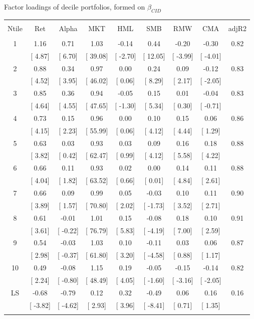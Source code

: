 \documentclass{beamer}
\begin{document}
\begin{frame}{Factor loadings of decile portfolios, formed on $\beta_{CID}$}
\vspace{-0.25cm}
\begin{table}[!htbp] \centering 
  \label{} 
\begin{tabular}{@{\extracolsep{0pt}} ccccccccc} 
\\[-1.8ex]\hline 
\hline \\[-1.8ex] 
Ntile & Ret & Alpha & MKT & HML & SMB & RMW & CMA & adjR2 \\ 
\hline \\[-1.8ex] 
1 & 1.16 & 0.71 & 1.03 & -0.14 & 0.44 & -0.20 & -0.30 & 0.82 \\ 
 & [ 4.87] & [ 6.70] & [ 39.08] & [ -2.70] & [ 12.05] & [ -3.99] & [ -4.01] &  \\ 
2 & 0.88 & 0.34 & 0.97 & 0.00 & 0.24 & 0.09 & -0.12 & 0.83 \\ 
 & [ 4.52] & [ 3.95] & [ 46.02] & [ 0.06] & [ 8.29] & [ 2.17] & [ -2.05] &  \\ 
3 & 0.85 & 0.36 & 0.94 & -0.05 & 0.15 & 0.01 & -0.04 & 0.83 \\ 
 & [ 4.64] & [ 4.55] & [ 47.65] & [ -1.30] & [ 5.34] & [ 0.30] & [ -0.71] &  \\ 
4 & 0.73 & 0.15 & 0.96 & 0.00 & 0.10 & 0.15 & 0.06 & 0.86 \\ 
 & [ 4.15] & [ 2.23] & [ 55.99] & [ 0.06] & [ 4.12] & [ 4.44] & [ 1.29] &  \\ 
5 & 0.63 & 0.03 & 0.93 & 0.03 & 0.09 & 0.16 & 0.18 & 0.88 \\ 
 & [ 3.82] & [ 0.42] & [ 62.47] & [ 0.99] & [ 4.12] & [ 5.58] & [ 4.22] &  \\ 
6 & 0.66 & 0.11 & 0.93 & 0.02 & 0.00 & 0.14 & 0.11 & 0.88 \\ 
 & [ 4.04] & [ 1.82] & [ 63.52] & [ 0.66] & [ 0.01] & [ 4.84] & [ 2.61] &  \\ 
7 & 0.66 & 0.09 & 0.99 & 0.05 & -0.03 & 0.10 & 0.11 & 0.90 \\ 
 & [ 3.89] & [ 1.57] & [ 70.80] & [ 2.02] & [ -1.73] & [ 3.52] & [ 2.71] &  \\ 
8 & 0.61 & -0.01 & 1.01 & 0.15 & -0.08 & 0.18 & 0.10 & 0.91 \\ 
 & [ 3.61] & [ -0.22] & [ 76.79] & [ 5.83] & [ -4.19] & [ 7.00] & [ 2.59] &  \\ 
9 & 0.54 & -0.03 & 1.03 & 0.10 & -0.11 & 0.03 & 0.06 & 0.87 \\ 
 & [ 2.98] & [ -0.37] & [ 61.80] & [ 3.20] & [ -4.58] & [ 0.88] & [ 1.17] &  \\ 
10 & 0.49 & -0.08 & 1.15 & 0.19 & -0.05 & -0.15 & -0.14 & 0.82 \\ 
 & [ 2.24] & [ -0.80] & [ 48.49] & [ 4.05] & [ -1.60] & [ -3.16] & [ -2.05] &  \\ 
LS & -0.68 & -0.79 & 0.12 & 0.32 & -0.49 & 0.06 & 0.16 & 0.16 \\ 
 & [ -3.82] & [ -4.62] & [ 2.93] & [ 3.96] & [ -8.41] & [ 0.71] & [ 1.35] &  \\ 
\hline \\[-1.8ex] 
\end{tabular} 
\end{table}
\end{frame}
\end{document}
